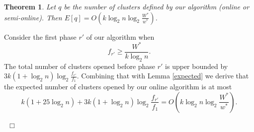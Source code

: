 \documentclass{article}
\newtheorem{theorem}{Theorem}
\newenvironment{proof}{\medskip\noindent {\bf Proof.}}{~\hfill$\Box$\medskip}
\begin{document}
\begin{theorem}
Let $q$ be the number of clusters defined by our algorithm (online or semi-online). Then $E[q]=O\left(k \log_2 n \log_2 \frac{W^*}{w^*}\right)$.
\end{theorem}
\begin{proof}
Consider the first phase $r'$ of our algorithm when $$f_{r'}\ge \frac{W^*}{k\log_2 n}.$$
The total number of clusters opened before phase $r'$ is upper bounded by $3k (1+\log_2 n)\log_2\frac{ f_{r'}}{f_1}$.
Combining that with Lemma \ref{expected} we derive that the expected number of clusters opened by our online algorithm is at most 
$$k(1+25\log_2 n) +3k(1+\log_2 n) \log_2\frac{ f_{r'}}{f_1}=O\left(k\log_2 n \log_2 \frac{W^*}{w^*}\right).$$

\end{proof}
\end{document}
